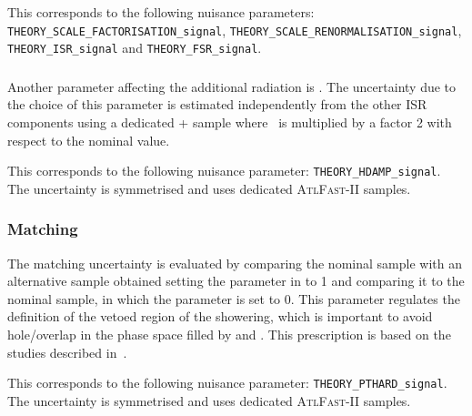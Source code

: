 This corresponds to the following nuisance parameters:
\texttt{THEORY\_SCALE\_FACTORISATION\_signal},
\texttt{THEORY\_SCALE\_RENORMALISATION\_signal},
\texttt{THEORY\_ISR\_signal} and
\texttt{THEORY\_FSR\_signal}.


\subsubsection{\texorpdfstring{\hdamp}{Hdamp}}%
\label{sec:systematics:hdamp}
Another parameter affecting the additional radiation is \hdamp.
The uncertainty due to the choice of this parameter is estimated independently
from the other ISR components using a dedicated \POWHEG{}+ sample
where \hdamp\ is multiplied by a factor 2 with respect to the nominal value.

This corresponds to the following nuisance parameter: \texttt{THEORY\_HDAMP\_signal}.
\\The uncertainty is symmetrised and uses dedicated \textsc{AtlFast-II} samples.

\subsubsection{Matching}%
\label{sec:systematics:matching}
The matching uncertainty is evaluated by comparing the nominal sample with
an alternative sample obtained setting the \pthard parameter in \PYTHIA to 1
and comparing it to the nominal sample, in which the parameter is set to 0.
This parameter regulates the definition of the vetoed region of the showering,
which is important to avoid hole/overlap in the phase space filled by \POWHEG
and \PYTHIA. This prescription is based on the studies described in~\cite{10.21468/SciPostPhys.12.1.010}.

This corresponds to the following nuisance parameter: \texttt{THEORY\_PTHARD\_signal}.
\\The uncertainty is symmetrised and uses dedicated \textsc{AtlFast-II} samples.


